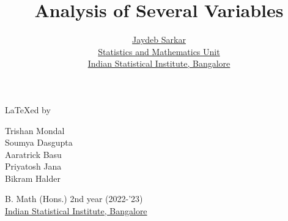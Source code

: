 \documentclass{report}
\title{\Huge Analysis of Several Variables}
\author{{\LARGE \href{https://www.isibang.ac.in/~jay/}{Jaydeb Sarkar}} \\[0.5cm]
  \href{https://www.isibang.ac.in/~statmath}{Statistics and Mathematics Unit} \\
  \href{https://www.isibang.ac.in}{Indian Statistical Institute, Bangalore}}
\date{}
\begin{document}



\maketitle

{\vspace*{\fill}\centering
  {\LARGE \LaTeX ed by}
  \vspace{0.5cm}
  \begin{center}
    \large
    Trishan Mondal \\
    Soumya Dasgupta \\
    Aaratrick Basu \\
    Priyatosh Jana \\
    Bikram Halder
  \end{center}
  \vspace{0.5cm}
  \begin{center}
    B. Math (Hons.) 2nd year (2022-'23) \\
    \href{https://www.isibang.ac.in}{Indian Statistical Institute, Bangalore}
  \end{center}
  \vspace*{\fill}}

\tableofcontents






















\end{document}
